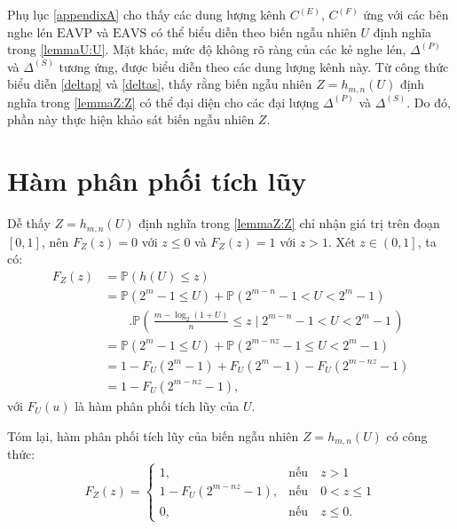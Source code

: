 \documentclass[../main.tex]{subfiles}
\begin{document}
\label{appendixB}

Phụ lục \ref{appendixA} cho thấy các dung lượng kênh $C^{(E)}$, $C^{(F)}$ ứng với các bên nghe lén $\text{EAVP}$ và $\text{EAVS}$ có thể biểu diễn theo biến ngẫu nhiên $U$ định nghĩa trong \eqref{lemmaU:U}. Mặt khác, mức độ không rõ ràng của các kẻ nghe lén, $\Delta^{(P)}$ và $\Delta^{(S)}$ tương ứng, được biểu diễn theo các dung lượng kênh này. Từ công thức biểu diễn \eqref{deltap} và \eqref{deltas}, thấy rằng biến ngẫu nhiên $Z = h_{m,n}\left(U\right)$ định nghĩa trong \eqref{lemmaZ:Z} có thể đại diện cho các đại lượng $\Delta^{(P)}$ và $\Delta^{(S)}$. Do đó, phần này thực hiện khảo sát biến ngẫu nhiên $Z$.

\section{Hàm phân phối tích lũy}

Dễ thấy $Z=h_{m,n}\left(U\right)$ định nghĩa trong \eqref{lemmaZ:Z} chỉ nhận giá trị trên đoạn $\left[0, 1\right]$, nên $F_Z(z) = 0$ với $z \leq 0$ và $F_Z(z) = 1$ với $z > 1$. Xét $z \in \left(0, 1\right]$, ta có:
\begin{equation*}
\begin{aligned}
    F_Z(z) 
    &= \mathbb{P}\left(h\left(U\right) \leq z\right)
    \\ &= \mathbb{P}\left(2^m-1 \leq U\right) + \mathbb{P}\left(2^{m-n} - 1 < U < 2^m - 1\right)\\ & \qquad.\mathbb{P}\left(\,\frac{m - \log_2\left({1 + U}\right)}{n} \leq z \mid 2^{m-n} - 1 < U < 2^m - 1\,\right)
    \\ &= \mathbb{P}\left(2^m-1 \leq U\right) + \mathbb{P}\left(2^{m-nz} - 1 \leq U < 2^m - 1\right)
    \\ &= 1 - F_U\left(2^m-1\right) + F_U\left(2^m - 1\right) - F_U\left(2^{m-nz} - 1\right)
    \\ &= 1 - F_U\left(2^{m-nz} - 1\right),
\end{aligned}
\end{equation*}
với $F_U\left(u\right)$ là hàm phân phối tích lũy của $U$.

Tóm lại, hàm phân phối tích lũy của biến ngẫu nhiên $Z = h_{m,n}\left(U\right)$ có công thức:
\begin{equation}
F_Z\left(z\right) = 
\begin{cases}
1,& \text{nếu}\quad z > 1\\
1-F_U\left(2^{m-nz}-1\right),& \text{nếu}\quad 0 < z \leq 1\\
0 ,& \text{nếu}\quad z \leq 0.
\end{cases}
\end{equation}
\end{document}
